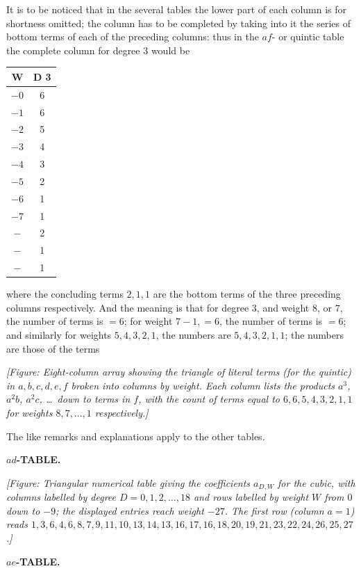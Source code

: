 \documentclass[11pt]{article}
\begin{document}
It is to be noticed that in the several tables the lower part of each column is for shortness omitted; the column has to be completed by taking into it the series of bottom terms of each of the preceding columns: thus in the $af$- or quintic table the complete column for degree 3 would be
\begin{center}
\begin{tabular}{cc}
W & D 3 \\
\hline
$-0$ & 6 \\
$-1$ & 6 \\
$-2$ & 5 \\
$-3$ & 4 \\
$-4$ & 3 \\
$-5$ & 2 \\
$-6$ & 1 \\
$-7$ & 1 \\
\hline
$-$ & 2 \\
$-$ & 1 \\
$-$ & 1
\end{tabular}
\end{center}
where the concluding terms $2, 1, 1$ are the bottom terms of the three preceding columns respectively. And the meaning is that for degree 3, and weight $8$, or $7$, the number of terms is $= 6$; for weight $7-1, = 6$, the number of terms is $= 6$; and similarly for weights $5, 4, 3, 2, 1$, the numbers are $5, 4, 3, 2, 1, 1$; the numbers are those of the terms

\textit{[Figure: Eight-column array showing the triangle of literal terms (for the quintic) in $a, b, c, d, e, f$ broken into columns by weight. Each column lists the products $a^3$, $a^2 b$, $a^2 c$, \ldots\ down to terms in $f$, with the count of terms equal to $6, 6, 5, 4, 3, 2, 1, 1$ for weights $8, 7, \ldots, 1$ respectively.]}

The like remarks and explanations apply to the other tables.

\bigskip
\begin{center}\textbf{$ad$-TABLE.}\end{center}

\textit{[Figure: Triangular numerical table giving the coefficients $a_{D, W}$ for the cubic, with columns labelled by degree $D = 0, 1, 2, \ldots, 18$ and rows labelled by weight $W$ from $0$ down to $-9$; the displayed entries reach weight $-27$. The first row (column $a = 1$) reads $1, 3, 6, 4, 6, 8, 7, 9, 11, 10, 13, 14, 13, 16, 17, 16, 18, 20, 19, 21, 23, 22, 24, 26, 25, 27$.]}

\bigskip
\begin{center}\textbf{$ae$-TABLE.}\end{center}
\end{document}
